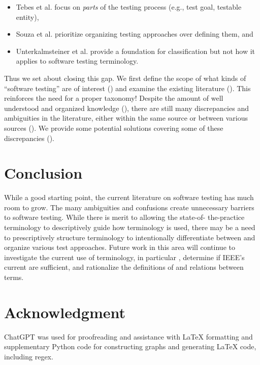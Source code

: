 \documentclass[conference]{IEEEtran}
\begin{document}
\begin{itemize}
    \item Tebes et al. \cite{TebesEtAl2020a} focus on \emph{parts} of the
          testing process (e.g., test goal, testable entity),
    \item Souza et al. \cite{SouzaEtAl2017} prioritize organizing testing
          approaches over defining them, and
    \item Unterkalmsteiner et al. \cite{UnterkalmsteinerEtAl2014} provide a
          foundation for classification but not how it applies to software
          testing terminology.
\end{itemize}

Thus we set about closing this gap. We first define the scope of what kinds of
``software testing'' are of interest () and examine the existing
literature (). This reinforces the need for a proper taxonomy!
Despite the amount of well understood and organized knowledge (),
there are still many discrepancies and ambiguities in the literature, either
within the same source or between various sources (). We provide
some potential solutions covering some of these discrepancies ().







\section{Conclusion}

While a good starting point, the current literature on software testing has
much room to grow. The many ambiguities and confusions create unnecessary
barriers to software testing. While there is merit to allowing the state-of-%
the-practice terminology to descriptively guide how terminology is used, there
may be a need to prescriptively structure terminology to intentionally
differentiate between and organize various test approaches. Future work in this
area will continue to investigate the current use of terminology, in
particular , determine if IEEE's current
 are sufficient, and rationalize the definitions of
and relations between terms.

\section*{Acknowledgment}

ChatGPT was used for proofreading and assistance with \LaTeX{} formatting and
supplementary Python code for constructing graphs and generating \LaTeX{} code,
including regex. 

\newpage



\end{document}
